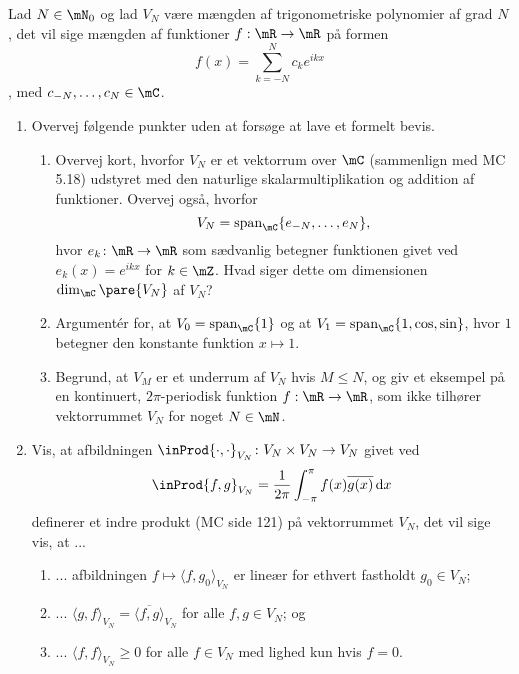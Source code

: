 \begin{opg}[Vektorrumstruktur]
Lad $N\in\mN_0$ og lad $V_N$ være mængden af trigonometriske polynomier af grad $N$, det vil sige mængden af funktioner $f: \mR \to \mR$ på formen 
$$ f(x) =  \sum_{k=-N}^N c_k e^{ikx}$$, med $c_{-N}, \ldots, c_N \in \mC$. 
\begin{enumerate}

    \item Overvej følgende punkter uden at forsøge at lave et formelt bevis.
	
	\begin{enumerate}[label=\roman*)]
    \item Overvej kort, hvorfor $V_N$ er et vektorrum over $\mC$ (sammenlign med MC 5.18) udstyret med den naturlige skalarmultiplikation og addition af funktioner. Overvej også, hvorfor 
	$$ V_N = \text{span}_{\mC}\{e_{-N}, \ldots, e_N\}, $$
	hvor $e_k\colon \mR \to \mR$ som sædvanlig betegner funktionen givet ved $e_k(x) = e^{ikx}$ for $k \in \mZ$. Hvad siger dette om dimensionen $\dim_{\mC}\pare{V_N}$ af $V_N$?
	
    \item Argumentér for, at $V_0 = \textup{span}_\mC \{1\}$ og at $V_1=\textup{span}_\mC\{1, \cos, \sin\}$, hvor $1$ betegner den konstante funktion $x \mapsto 1$. 
	
	\item Begrund, at $V_M$ er et underrum af $V_N$ hvis $M \leq N$, og giv et eksempel på en kontinuert, $2 \pi$-periodisk funktion $f: \mR \to \mR$, som ikke tilhører vektorrummet $V_N$ for noget $N \in \mN$.
    \end{enumerate}
    
    \iffalse\begin{proof}[Løsning]
	Udelades. Spørg din underviser eller til spørgetimen.
	\end{proof}\fi
	
    \item Vis, at afbildningen $\inProd{\cdot,\cdot}_{V_N}\colon V_N\times V_N \to V_N$ givet ved 
    $$ \inProd{f,g}_{V_N}
        = \frac{1}{2\pi}\int_{-\pi}^{\pi} {f(x)}\overline{g(x)}\,\mathrm{d}x $$
	definerer et indre produkt (MC side 121) på vektorrummet $V_N$, det vil sige vis, at ...
	\begin{enumerate}[label=\roman*)]
		\item ... afbildningen $f \mapsto \langle f, g_0 \rangle_{V_N}$ er lineær for ethvert fastholdt $g_0 \in V_N$;
		\item ... $\langle  g,f \rangle_{V_N}= \overline{\langle f, g \rangle}_{V_N}$ for alle $f,g \in V_N$; og 
		\item ... $\langle f,f \rangle_{V_N} \geq 0$ for alle $f \in V_N$ med lighed kun hvis $f=0$.
    \end{enumerate}
    

\end{enumerate}
\end{opg}
